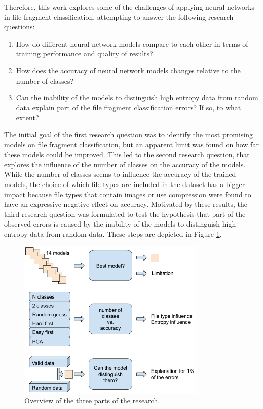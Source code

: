 Therefore, this work explores some of the challenges of applying neural networks in file fragment classification, attempting to answer the following research questions:

\begin{enumerate}[itemindent=\parindent,label=\textbf{Q\arabic*.}]

    \item How do different neural network models compare to each other in terms of training performance and quality of results?
    
    \item How does the accuracy of neural network models changes relative to the number of classes?

    \item Can the inability of the models to distinguish high entropy data from random data explain part of the file fragment classification errors? If so, to what extent?
\end{enumerate}

The initial goal of the first research question was to identify the most promising models on file fragment classification, but an apparent limit was found on how far these models could be improved.
This led to the second research question, that explores the influence of the number of classes on the accuracy of the models. While the number of classes seems to influence the accuracy of the trained models, the choice of which file types are included in the dataset has a bigger impact because file types that contain images or use compression were found to have an expressive negative effect on accuracy.
Motivated by these results, the third research question was formulated to test the hypothesis that part of the observed errors is caused by the inability of the models to distinguish high entropy data from random data.
{\color{red}
These steps are depicted in Figure \ref{fig:steps}.
}

\noindent
\begin{figure}[htb!]
\centering\includegraphics[width=0.8\textwidth]{content/3phases.png}
\caption[Research parts]{\label{fig:steps}Overview of the three parts of the research.}%
\end{figure}

